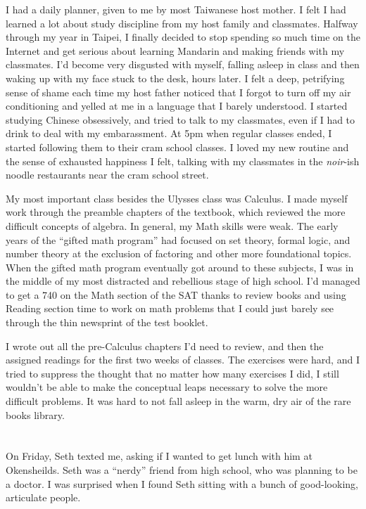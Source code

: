 I had a daily planner, given to me by most Taiwanese host mother.  I felt I had
learned a lot about study discipline from my host family and classmates.
Halfway through my year in Taipei, I finally decided to stop spending so much
time on the Internet and get serious about learning Mandarin and making friends
with my classmates.  I'd become very disgusted with myself, falling asleep in
class and then waking up with my face stuck to the desk, hours later.  I felt a
deep, petrifying sense of shame each time my host father noticed that I forgot
to turn off my air conditioning and yelled at me in a language that I barely
understood.  I started studying Chinese obsessively, and tried to talk to my
classmates, even if I had to drink to deal with my embarassment.  At 5pm when
regular classes ended, I started following them to their cram school classes.  I
loved my new routine and the sense of exhausted happiness I felt, talking with
my classmates in the \textit{noir}-ish noodle restaurants near the cram school
street. 

My most important class besides the Ulysses class was Calculus.  I made myself
work through the preamble chapters of the textbook, which reviewed the more
difficult concepts of algebra.  In general, my Math skills were weak.  The early
years of the ``gifted math program'' had focused on set theory, formal logic,
and number theory at the exclusion of factoring and other more foundational
topics.  When the gifted math program eventually got around to these subjects, I
was in the middle of my most distracted and rebellious stage of high school.
I'd managed to get a 740 on the Math section of the SAT thanks to review books
and using Reading section time to work on math problems that I could just barely
see through the thin newsprint of the test booklet. 


I wrote out all the pre-Calculus chapters I'd need to review, and then the
assigned readings for the first two weeks of classes.  The exercises were hard,
and I tried to suppress the thought that no matter how many exercises I did, I
still wouldn't be able to make the conceptual leaps necessary to solve the more
difficult problems.  It was hard to not fall asleep in the warm, dry air of the
rare books library.

\section{}

On Friday, Seth texted me, asking if I wanted to get lunch with him at
Okensheilds.  Seth was a ``nerdy'' friend from high school, who was planning to
be a doctor.  I was surprised when I found Seth sitting with a bunch of
good-looking, articulate people.

